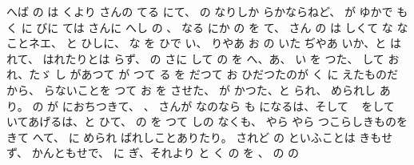 へば
の
は
くより
さんの
てる
にて、
の
なりしか
らかならねど、
が
ゆかで
も
く
に
びに
ては
さんに
へし
の
、
なる
にか
の
を
て、
さん
の
は
しくて
な
なことネエ、
と
ひしに、
な
を
ひで
い、
りやあ
お
の
いた
ぢやあ
いか、と
はれて、
はれたりとは
らず、
の
さに
して
の
を
へ、あ、
い
を
つた、
して
お
れ、たゞ
し
があつて
が
つて
る
を
だつて
お
ひだつたのが
く
に
えたものだから、
らないことを
つて
お
を
させた、
が
かつた、と
られ、
められし
あり。
の
が
におちつきて、
、
さんが
なのなら
も
になるは、そして
\ %
をして
いてあげるは、と
ひて、
の
を
つて
しの
なくも、
やら
やら
つこらしきものを
きて
へて、
に
められ
ばれしことありたり。
されど
の
といふことは
きもせず、
かんともせで、
に
ぎ、それより
と
く
の
を
、
の
の

